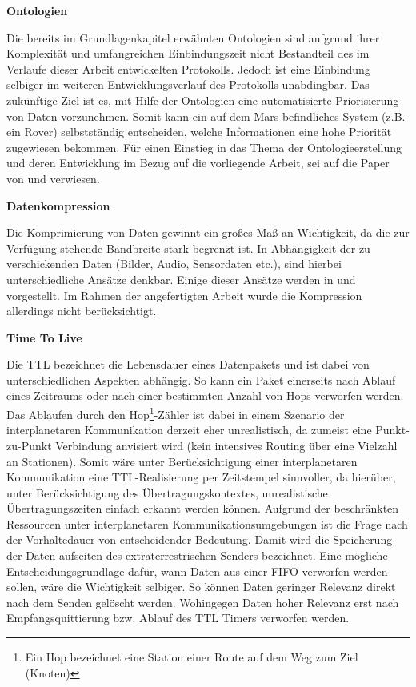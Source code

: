 \label{sec:Vorueberlegung}

\textbf{Ontologien}

Die bereits im Grundlagenkapitel erw{\"a}hnten Ontologien sind aufgrund ihrer
Komplexit{\"a}t und umfangreichen Einbindungszeit nicht Bestandteil des im
Verlaufe dieser Arbeit entwickelten Protokolls. Jedoch ist eine Einbindung
selbiger im weiteren Entwicklungsverlauf des Protokolls unabdingbar. Das
zuk{\"u}nftige Ziel ist es, mit Hilfe der Ontologien eine automatisierte
Priorisierung von Daten vorzunehmen. Somit kann ein auf dem Mars befindliches
System (z.B. ein Rover) selbstst{\"a}ndig entscheiden, welche Informationen eine
hohe Priorit{\"a}t zugewiesen bekommen. F{\"u}r einen Einstieg in das Thema der
Ontologieerstellung und deren Entwicklung im Bezug auf die vorliegende Arbeit,
sei auf die Paper von \cite{Noy2000} und \cite{Daher} verwiesen.

\textbf{Datenkompression}

Die Komprimierung von Daten gewinnt ein gro{\ss}es Ma{\ss} an Wichtigkeit, da
die zur Verf{\"u}gung stehende Bandbreite stark begrenzt ist. In Abh{\"a}ngigkeit der zu
verschickenden Daten (Bilder, Audio, Sensordaten etc.), sind hierbei
unterschiedliche Ans{\"a}tze denkbar. Einige dieser Ans{\"a}tze werden in
\cite{Kiely2006} und \cite{Kiely2007} vorgestellt. Im Rahmen der angefertigten
Arbeit wurde die Kompression allerdings nicht ber{\"u}cksichtigt.

\textbf{Time To Live}

Die \gls{TTL} bezeichnet die Lebensdauer eines Datenpakets und ist
dabei von unterschiedlichen Aspekten abh{\"a}ngig. So kann ein Paket einerseits nach
Ablauf eines Zeitraums oder nach einer bestimmten Anzahl
von Hops verworfen werden. Das Ablaufen durch den Hop\footnote{Ein Hop
bezeichnet eine Station einer Route auf dem Weg zum Ziel (Knoten)}-Zähler
ist dabei in einem Szenario der interplanetaren Kommunikation derzeit eher
unrealistisch, da zumeist eine Punkt-zu-Punkt Verbindung anvisiert wird (kein
intensives Routing {\"u}ber eine Vielzahl an Stationen). Somit w{\"a}re unter
Ber{\"u}cksichtigung einer interplanetaren Kommunikation eine
\gls{TTL}-Realisierung per Zeitstempel sinnvoller, da hier{\"u}ber, unter Ber{\"u}cksichtigung des
{\"U}bertragungskontextes, unrealistische {\"U}bertragungszeiten einfach erkannt
werden k{\"o}nnen.
Aufgrund der beschr{\"a}nkten Ressourcen unter interplanetaren
Kommunikationsumgebungen ist die Frage nach der Vorhaltedauer von
entscheidender Bedeutung. Damit wird die Speicherung der
Daten aufseiten des extraterrestrischen Senders bezeichnet. 
Eine m{\"o}gliche Entscheidungsgrundlage daf{\"u}r, wann Daten aus einer
\gls{FIFO} verworfen werden sollen, w{\"a}re die Wichtigkeit selbiger. So
k{\"o}nnen Daten geringer Relevanz direkt nach dem Senden gel{\"o}scht werden.
Wohingegen Daten hoher Relevanz erst nach Empfangsquittierung bzw. Ablauf des
\gls{TTL} Timers verworfen werden.

